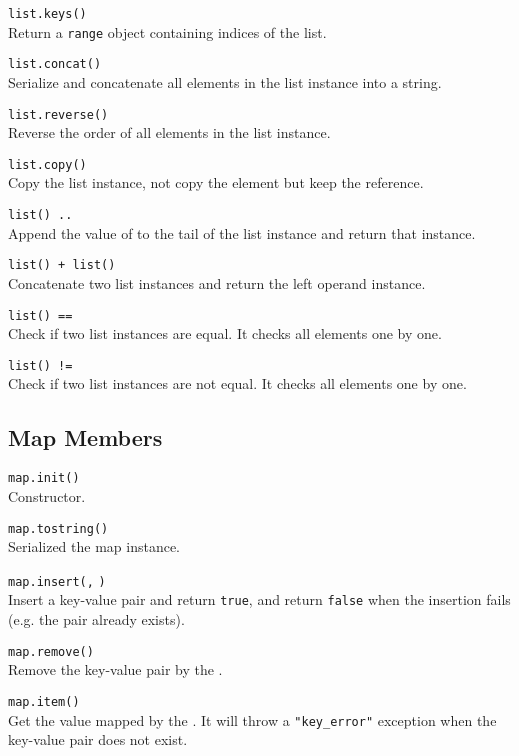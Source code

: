 \hangpar \texttt{list.keys()}\\
Return a \texttt{range} object containing indices of the list.

\hangpar \texttt{list.concat()}\\
Serialize and concatenate all elements in the list instance into a string.

\hangpar \texttt{list.reverse()}\\
Reverse the order of all elements in the list instance.

\hangpar \texttt{list.copy()}\\
Copy the list instance, not copy the element but keep the reference.

\hangpar \texttt{list() .. }\\
Append the value of  to the tail of the list instance and return that instance.

\hangpar \texttt{list() + }\texttt{list()}\\
Concatenate two list instances and return the left operand instance.

\hangpar \texttt{list() == }\\
Check if two list instances are equal. It checks all elements one by one.

\hangpar \texttt{list() != }\\
Check if two list instances are not equal. It checks all elements one by one.

\subsection*{Map Members}

\hangpar \texttt{map.init()}\\
Constructor.

\hangpar \texttt{map.tostring()}\\
Serialized the map instance.

\hangpar \texttt{map.insert(}\texttt{,} \texttt{)}\\
Insert a key-value pair and return \texttt{true}, and return \texttt{false} when the insertion fails (e.g. the pair already exists).

\hangpar \texttt{map.remove(}\texttt{)}\\
Remove the key-value pair by the .

\hangpar \texttt{map.item(}\texttt{)}\\
Get the value mapped by the . It will throw a \texttt{"key\_error"} exception when the key-value pair does not exist.

